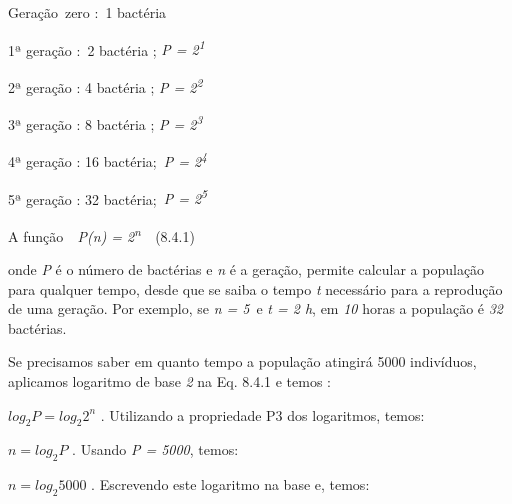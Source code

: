 \documentclass[12pt]{article}
\begin{document}
\vspace{\baselineskip}
Geração\  zero :\ 1 bactéria  \par

1ª geração :\ 2 bactéria  ; \textit{P = 2\textsuperscript{1}}\par

2ª geração : 4 bactéria ; \textit{P = 2\textsuperscript{2}}\par

3ª geração : 8 bactéria ; \textit{P = 2\textsuperscript{3}}\par

4ª geração : 16 bactéria;\  \textit{P = 2\textsuperscript{4}}\par

5ª geração : 32 bactéria;\  \textit{P = 2\textsuperscript{5}}\par


\vspace{\baselineskip}
A função\textit{\ \  P(n) = 2\textsuperscript{n}\ \  \tab \tab \tab \tab \tab \tab \tab \tab }(8.4.1)\par


\vspace{\baselineskip}

\vspace{\baselineskip}
onde \textit{P} é o número de bactérias e \textit{n }é a geração, permite calcular a população para qualquer tempo, desde que se saiba o tempo \textit{t} necessário para a reprodução de uma geração. Por exemplo, se \textit{n = 5}\  e \textit{t = 2 h}, em \textit{10} horas a população é \textit{32} bactérias. \par


\vspace{\baselineskip}
Se precisamos saber em quanto tempo a população atingirá 5000 indivíduos, aplicamos logaritmo de base \textit{2} na Eq. 8.4.1 e temos :\par


\vspace{\baselineskip}
 \( log_{2}P=log_{2}2^{n} \) . Utilizando a propriedade P3 dos logaritmos, temos:\par


\vspace{\baselineskip}
 \( n=log_{2}P \) . Usando \textit{P = 5000}, temos:\par


\vspace{\baselineskip}
 \( n=log_{2}5000 \)  . Escrevendo este logaritmo na base e, temos:\par
\end{document}
